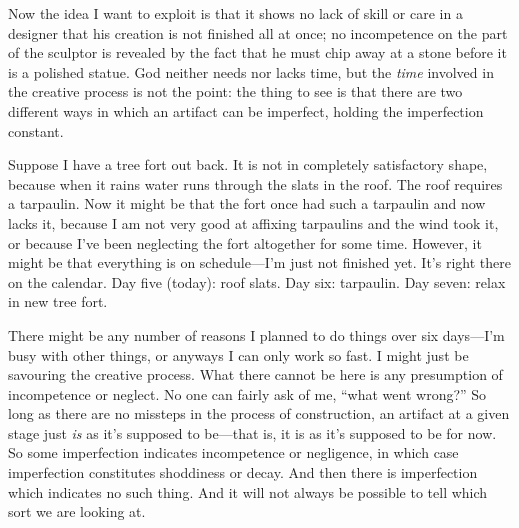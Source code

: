 \documentclass[11pt]{amsart}
\begin{document}

Now the idea I want to exploit is that it shows no lack of skill or care in a designer that his creation is not finished all at once; no incompetence on the part of the sculptor is revealed by the fact that he must chip away at a stone before it is a polished statue. God neither needs nor lacks time, but the \emph{time} involved in the creative process is not the point: the thing to see is that there are two different ways in which an artifact can be imperfect, holding the imperfection constant.

Suppose I have a tree fort out back. It is not in completely satisfactory shape, because when it rains water runs through the slats in the roof. The roof requires a tarpaulin. Now it might be that the fort once had such a tarpaulin and now lacks it, because I am not very good at affixing tarpaulins and the wind took it, or because I've been neglecting the fort altogether for some time. However, it might be that everything is on schedule---I'm just not finished yet. It's right there on the calendar. Day five (today): roof slats. Day six: tarpaulin. Day seven: relax in new tree fort.

There might be any number of reasons I planned to do things over six days---I'm busy with other things, or anyways I can only work so fast. I might just be savouring the creative process. What there cannot be here is any presumption of incompetence or neglect. No one can fairly ask of me, ``what went wrong?'' So long as there are no missteps in the process of construction, an artifact at a given stage just \emph{is} as it's supposed to be---that is, it is as it's supposed to be for now. So some imperfection indicates incompetence or negligence, in which case imperfection constitutes shoddiness or decay. And then there is imperfection which indicates no such thing. And it will not always be possible to tell which sort we are looking at.
\end{document}
